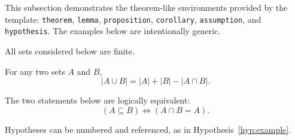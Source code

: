 
This subsection demonstrates the theorem-like environments provided by the
template: \texttt{theorem}, \texttt{lemma}, \texttt{proposition},
\texttt{corollary}, \texttt{assumption}, and \texttt{hypothesis}. The
examples below are intentionally generic.

\begin{assumption}
All sets considered below are finite.
\end{assumption}

\begin{proposition}
For any two sets $A$ and $B$,
\[
|A \cup B| = |A| + |B| - |A \cap B|.
\]
\end{proposition}

\begin{hypothesis}
The two statements below are logically equivalent:
\[
(A \subseteq B) \iff (A \cap B = A).
\]
\label{hyp:example}
\end{hypothesis}

Hypotheses can be numbered and referenced, as in Hypothesis~\ref{hyp:example}.
